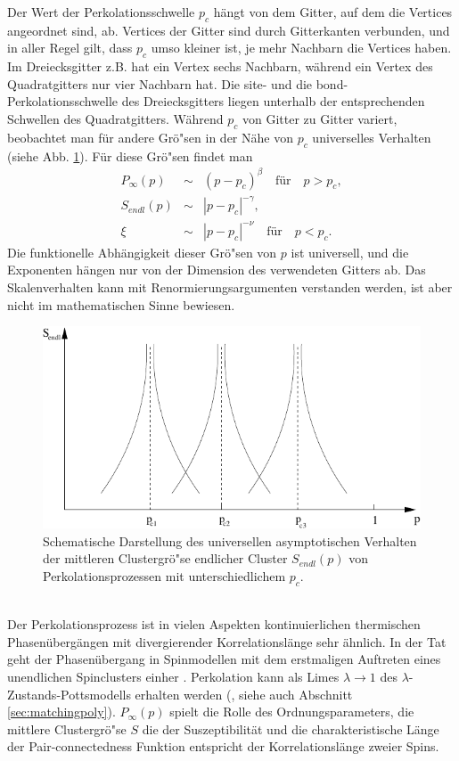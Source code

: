 Der Wert der Perkolationsschwelle $p_c$ h\"angt von dem Gitter, auf dem die Vertices angeordnet sind, ab. Vertices der Gitter sind durch Gitterkanten verbunden, und in aller Regel gilt, dass $p_c$ umso kleiner ist, je mehr Nachbarn die Vertices haben. Im Dreiecksgitter z.B. hat ein Vertex sechs Nachbarn, w\"ahrend ein Vertex des Quadratgitters nur vier Nachbarn hat. Die site- und die bond-Perkolationsschwelle des Dreiecksgitters liegen unterhalb der entsprechenden Schwellen des Quadratgitters. W\"ahr\-end $p_c$ von Gitter zu Gitter variert, beobachtet man f\"ur andere Gr\"o"sen in der N\"ahe von $p_c$ universelles Verhalten (siehe Abb. \ref{fig:universal}). F\"ur diese Gr\"o"sen findet man  
\begin{eqnarray}
P_{\infty}(p) & \sim & (p-p_c)^\beta \quad \text{f\"ur} \quad p>p_c, \\
S_{endl}(p) & \sim & |p-p_c|^{-\gamma},  \\
\xi & \sim & |p-p_c|^{-\nu}  \quad \text{f\"ur} \quad p<p_c.
\end{eqnarray}
Die funktionelle Abh\"angigkeit dieser Gr\"o"sen von $p$ ist universell, und die Exponenten h\"angen nur von der Dimension des verwendeten Gitters ab. Das Skalenverhalten kann mit Renormierungsargumenten verstanden werden, ist aber nicht im mathematischen Sinne bewiesen.
\begin{figure}[tbp]
  \centering
  \includegraphics{./Einleitung-figs/universal}
  \caption{Schematische Darstellung des universellen asymptotischen Verhalten der mittleren Clustergr\"o"se endlicher Cluster $S_{endl}(p)$ von Perkolationsprozessen mit unterschiedlichem $p_c$.}
  \label{fig:universal}
\end{figure}
\\Der Perkolationsprozess ist in vielen Aspekten kontinuierlichen thermischen Phasen\"uber\-g\"an\-gen mit divergierender Korrelationsl\"ange sehr \"ahnlich. In der Tat geht der Phasen\"ubergang in Spinmodellen mit dem erstmaligen Auftreten eines unendlichen Spinclusters einher \cite{Coniglio:77}. Perkolation kann als Limes $\lambda \rightarrow 1$ des $\lambda$-Zustands-Pottsmodells erhalten werden (\cite{Fortuin:72}, siehe auch Abschnitt \ref{sec:matchingpoly}). $P_{\infty}(p)$ spielt die Rolle des Ordnungsparameters, die mittlere Clustergr\"o"se $S$ die der Suszeptibilit\"at und die charakteristische L\"ange der Pair-connectedness Funktion entspricht der Korrelationsl\"ange zweier Spins.\\

